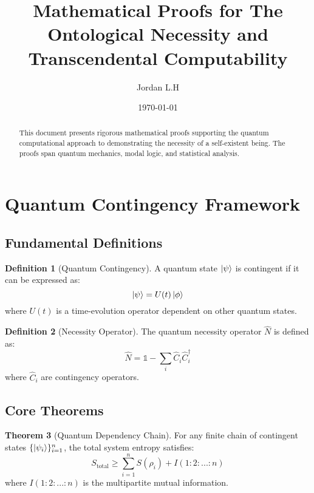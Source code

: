 \documentclass[12pt]{article}
\title{Mathematical Proofs for The Ontological Necessity and Transcendental Computability}
\author{Jordan L.H}
\date{\today}
\theoremstyle{definition}
\newtheorem{theorem}{Theorem}[section]
\newtheorem{definition}[theorem]{Definition}
\begin{document}
\maketitle

\begin{abstract}
This document presents rigorous mathematical proofs supporting the quantum computational approach to demonstrating the necessity of a self-existent being. The proofs span quantum mechanics, modal logic, and statistical analysis.
\end{abstract}

\tableofcontents

\section{Quantum Contingency Framework}

\subsection{Fundamental Definitions}

\begin{definition}[Quantum Contingency]
A quantum state $\ket{\psi}$ is contingent if it can be expressed as:
\begin{equation}
    \ket{\psi} = U(t)\ket{\phi}
\end{equation}
where $U(t)$ is a time-evolution operator dependent on other quantum states.
\end{definition}

\begin{definition}[Necessity Operator]
The quantum necessity operator $\hat{N}$ is defined as:
\begin{equation}
    \hat{N} = \mathbb{1} - \sum_i \hat{C}_i\hat{C}_i^\dagger
\end{equation}
where $\hat{C}_i$ are contingency operators.
\end{definition}

\subsection{Core Theorems}

\begin{theorem}[Quantum Dependency Chain]
For any finite chain of contingent states $\{\ket{\psi_i}\}_{i=1}^n$, the total system entropy satisfies:
\begin{equation}
    S_{\text{total}} \geq \sum_{i=1}^n S(\rho_i) + I(1:2:...:n)
\end{equation}
where $I(1:2:...:n)$ is the multipartite mutual information.
\end{theorem}
\end{document}
